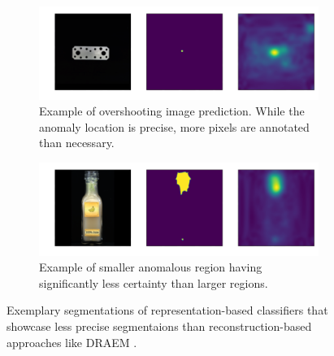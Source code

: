 \begin{figure}[H]
    \captionsetup[subfigure]{justification=centering}
    \centering
    \begin{subfigure}[b]{0.45\textwidth}
        \centering
        \includegraphics[width=\textwidth]{figures/overshootexamples/flat_connector_test_logical_anomalies_004.png}
        \caption{Example of overshooting image prediction. While the anomaly location is precise, more pixels are annotated than necessary.}

    \end{subfigure}
    \begin{subfigure}[b]{0.45\textwidth}
        \centering
        \includegraphics[width=\textwidth]{figures/overshootexamples/juice_bottle_test_structural_anomalies_019.png}
        \caption{Example of smaller anomalous region having significantly less certainty than larger regions.}

    \end{subfigure}
    
    \caption{Exemplary segmentations of representation-based classifiers that showcase less precise segmentaions than reconstruction-based approaches like DRAEM \cite{Zavrtanik_2021DRAEM}.}
    \label{fig:overshoot}
\end{figure}